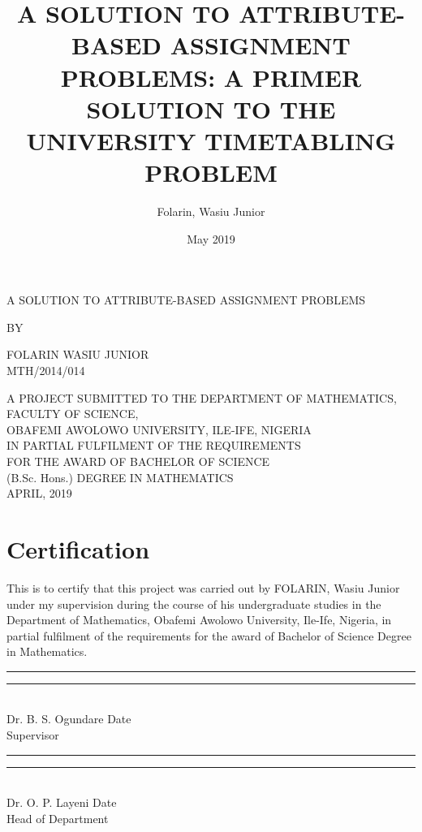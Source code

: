 \documentclass[a4paper,openany]{book}
\title{A SOLUTION TO ATTRIBUTE-BASED ASSIGNMENT PROBLEMS: A PRIMER SOLUTION TO THE UNIVERSITY TIMETABLING PROBLEM}
\date{May 2019}
\author{Folarin, Wasiu Junior}
\begin{document}
	\linespread{1.6}
	\large
	\setlength{\biblabelsep}{0.3em}
	\makeatletter
	\renewcommand{\@biblabel}[1]{\stepcounter{MyBibCount}\theMyBibCount.}
	\makeatother
	\frontmatter
	\begin{titlepage}
		\begin{center}
			A SOLUTION TO ATTRIBUTE-BASED ASSIGNMENT PROBLEMS%
		\end{center}
		\vfill
		\begin{center}
			BY
		\end{center}
		\vfill
		\begin{center}
			FOLARIN WASIU JUNIOR\\[0.25in]
			MTH/2014/014
		\end{center}
		\vfill
		\begin{center}
			A PROJECT SUBMITTED TO THE DEPARTMENT OF MATHEMATICS, FACULTY OF SCIENCE,\\
			OBAFEMI AWOLOWO UNIVERSITY, ILE-IFE, NIGERIA\\
			IN PARTIAL FULFILMENT OF THE REQUIREMENTS\\
			FOR THE AWARD OF BACHELOR OF SCIENCE\\
			(B.Sc. Hons.) DEGREE IN MATHEMATICS\\ \bigskip
			APRIL, 2019
		\end{center}
	\end{titlepage}
	\chapter[Certification]{\centering Certification}
	This is to certify that this project was carried out by FOLARIN, Wasiu Junior under my supervision during the course of his undergraduate studies in the Department of Mathematics, Obafemi Awolowo University, Ile-Ife, Nigeria, in partial fulfilment of the requirements for the award of Bachelor of Science Degree in Mathematics.
	\\[1in]
	\rule{1.5in}{0.1pt} \hfill \rule{1in}{0.4pt}
	\\[2ex]
	Dr. B. S. Ogundare \hfill Date \hspace{4ex}
	\\[1ex]
	Supervisor
	\\[1.5in]
	\rule{1.5in}{0.1pt} \hfill \rule{1in}{0.4pt}
	\\[2ex]
	Dr. O. P. Layeni \hfill Date \hspace{4ex}
	\\[1ex]
	Head of Department
	
\end{document}
